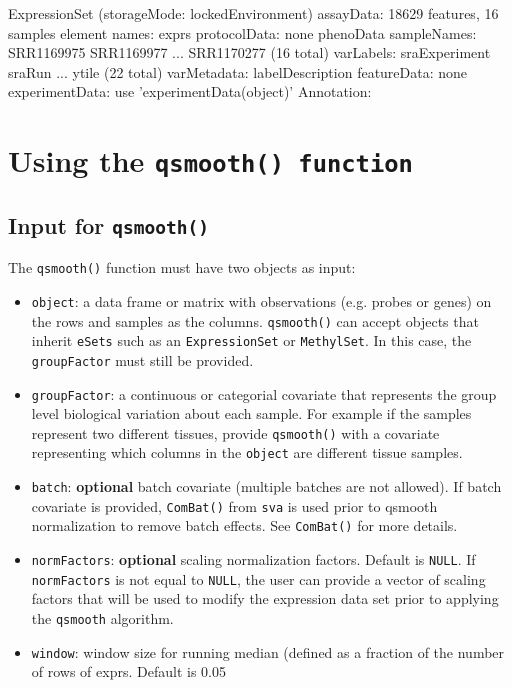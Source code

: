 \documentclass{article}
\begin{document}
\begin{Schunk}
\begin{Soutput}
ExpressionSet (storageMode: lockedEnvironment)
assayData: 18629 features, 16 samples 
  element names: exprs 
protocolData: none
phenoData
  sampleNames: SRR1169975 SRR1169977 ... SRR1170277 (16 total)
  varLabels: sraExperiment sraRun ... ytile (22 total)
  varMetadata: labelDescription
featureData: none
experimentData: use 'experimentData(object)'
Annotation:  
\end{Soutput}
\end{Schunk}

\section{Using the \texttt{qsmooth() function}}


\subsection{Input for \texttt{qsmooth()}}
The \texttt{qsmooth()} function must have two objects as input:

\begin{itemize}
\item \texttt{object}: a data frame or matrix with observations
(e.g. probes or genes) on the rows and samples as the columns.
\texttt{qsmooth()} can accept objects that inherit \texttt{eSets}
such as an \texttt{ExpressionSet} or \texttt{MethylSet}. In this case,
the \texttt{groupFactor} must still be provided.
\item \texttt{groupFactor}: a continuous or categorial covariate
that represents the group level biological variation about each sample.
For example if the samples represent two different tissues,
provide \texttt{qsmooth()} with a covariate representing
which columns in the \texttt{object} are different tissue samples.
\item \texttt{batch}: {\bf optional} batch covariate (multiple
batches are not allowed). If batch covariate is provided,
\texttt{ComBat()} from \texttt{sva} is used prior to
qsmooth normalization to remove batch effects.
See \texttt{ComBat()} for more details.
\item \texttt{normFactors}: {\bf optional} scaling normalization factors.
Default is \texttt{NULL}. If \texttt{normFactors} is not equal to
\texttt{NULL}, the user can provide a vector of scaling factors
that will be used to modify the expression data set prior to
applying the \texttt{qsmooth} algorithm.
\item \texttt{window}: window size for running median (defined as a
fraction of the number of rows of exprs. Default is 0.05
\end{itemize}
\end{document}
